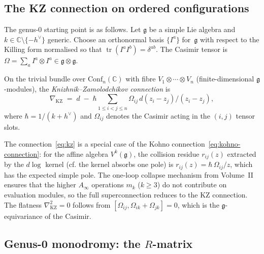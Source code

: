 \subsection{The KZ connection on ordered configurations}
\label{sec:kz-connection}

The genus-$0$ starting point is as follows. Let $\mathfrak{g}$ be a simple
Lie algebra and $k \in \mathbb{C} \setminus \{-h^\vee\}$ generic.
Choose an orthonormal basis $\{I^a\}$ for~$\mathfrak{g}$ with respect
to the Killing form normalised so that
$\operatorname{tr}(I^a I^b) = \delta^{ab}$. The Casimir tensor is
$\Omega = \sum_a I^a \otimes I^a \in \mathfrak{g} \otimes \mathfrak{g}$.

\begin{definition}[KZ connection]
\ClaimStatusProvedHere
\label{def:kz-connection}
On the trivial bundle over $\mathrm{Conf}_n(\mathbb{C})$ with fibre
$V_1 \otimes \cdots \otimes V_n$ (finite-dimensional
$\mathfrak{g}$-modules), the \emph{Knizhnik--Zamolodchikov connection}
is
\begin{equation}\label{eq:kz}
\nabla_{\mathrm{KZ}}
\;=\;
d
\;-\;
\hbar
\sum_{1 \leq i < j \leq n}
\Omega_{ij}\,d(z_i - z_j)/(z_i - z_j),
\end{equation}
where $\hbar = 1/(k + h^\vee)$ and $\Omega_{ij}$ denotes the
Casimir acting in the $(i,j)$ tensor slots.
\end{definition}

\begin{remark}
The connection~\eqref{eq:kz} is a special case of the Kohno
connection~\eqref{eq:kohno-connection}: for the affine algebra
$V^k(\mathfrak{g})$, the collision residue $r_{ij}(z)$ extracted by
the $d\log$ kernel (cf.\: the kernel absorbs one pole) is
$r_{ij}(z) = \hbar\,\Omega_{ij}/z$, which has the expected
simple pole.
The one-loop collapse mechanism from Volume~II
ensures that the higher $A_\infty$ operations $m_k$ ($k \geq 3$) do not
contribute on evaluation modules, so the full superconnection reduces to
the KZ connection. The flatness $\nabla_{\mathrm{KZ}}^2 = 0$ follows
from $[\Omega_{ij}, \Omega_{ik} + \Omega_{jk}] = 0$, which is the
$\mathfrak{g}$-equivariance of the Casimir.
\end{remark}

\subsection{Genus-0 monodromy: the $R$-matrix}
\label{sec:genus0-monodromy}

